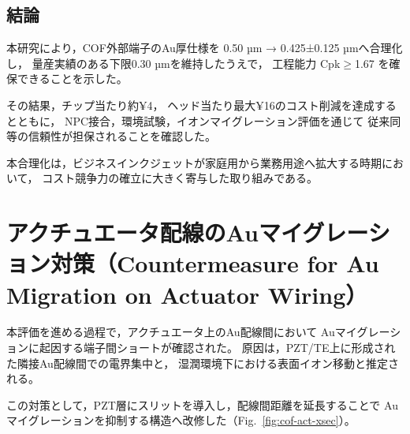 \documentclass[conference]{IEEEtran}
\begin{document}
\subsection{結論}
本研究により，COF外部端子のAu厚仕様を
0.50 µm → 0.425±0.125 µmへ合理化し，
量産実績のある下限0.30 µmを維持したうえで，
工程能力 Cpk$\geq$1.67 を確保できることを示した。  

その結果，チップ当たり約¥4，
ヘッド当たり最大¥16のコスト削減を達成するとともに，
NPC接合，環境試験，イオンマイグレーション評価を通じて
従来同等の信頼性が担保されることを確認した。  

本合理化は，ビジネスインクジェットが家庭用から業務用途へ拡大する時期において，
コスト競争力の確立に大きく寄与した取り組みである。

\appendices
\section{アクチュエータ配線のAuマイグレーション対策（Countermeasure for Au Migration on Actuator Wiring）}

本評価を進める過程で，アクチュエータ上のAu配線間において
Auマイグレーションに起因する端子間ショートが確認された。  
原因は，PZT/TE上に形成された隣接Au配線間での電界集中と，
湿潤環境下における表面イオン移動と推定される。

この対策として，PZT層にスリットを導入し，配線間距離を延長することで
Auマイグレーションを抑制する構造へ改修した（Fig.~\ref{fig:cof-act-xsec}）。
\end{document}

